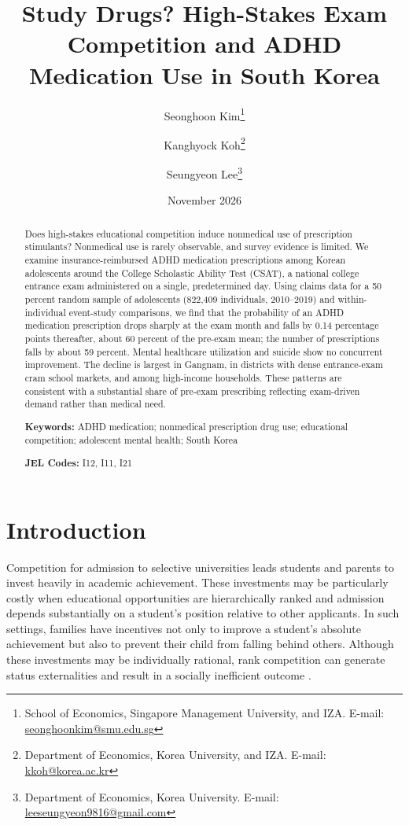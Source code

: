 \documentclass[12pt]{article}
\title{Study Drugs? High-Stakes Exam Competition and ADHD Medication Use in South Korea}
\author{
  Seonghoon Kim\thanks{School of Economics, Singapore Management University, and IZA. E-mail: \href{mailto:seonghoonkim@smu.edu.sg}{seonghoonkim@smu.edu.sg}}
  \and
  Kanghyock Koh\thanks{Department of Economics, Korea University, and IZA. E-mail: \href{mailto:kkoh@korea.ac.kr}{kkoh@korea.ac.kr}}
  \and
  Seungyeon Lee\thanks{Department of Economics, Korea University. E-mail: \href{mailto:leeseungyeon9816@gmail.com}{leeseungyeon9816@gmail.com}}
}
\date{November 2026}
\begin{document}
\maketitle

\begin{abstract}
\noindent Does high-stakes educational competition induce nonmedical use of prescription stimulants? Nonmedical use is rarely observable, and survey evidence is limited. We examine insurance-reimbursed ADHD medication prescriptions among Korean adolescents around the College Scholastic Ability Test (CSAT), a national college entrance exam administered on a single, predetermined day. Using claims data for a 50 percent random sample of adolescents (822,409 individuals, 2010--2019) and within-individual event-study comparisons, we find that the probability of an ADHD medication prescription drops sharply at the exam month and falls by 0.14 percentage points thereafter, about 60 percent of the pre-exam mean; the number of prescriptions falls by about 59 percent. Mental healthcare utilization and suicide show no concurrent improvement. The decline is largest in Gangnam, in districts with dense entrance-exam cram school markets, and among high-income households. These patterns are consistent with a substantial share of pre-exam prescribing reflecting exam-driven demand rather than medical need.

\medskip
\noindent\textbf{Keywords:} ADHD medication; nonmedical prescription drug use; educational competition; adolescent mental health; South Korea

\noindent\textbf{JEL Codes:} I12, I11, I21
\end{abstract}

\thispagestyle{empty}
\newpage
\setcounter{page}{1}

\section{Introduction}

Competition for admission to selective universities leads students and parents to invest heavily in academic achievement. These investments may be particularly costly when educational opportunities are hierarchically ranked and admission depends substantially on a student's position relative to other applicants. In such settings, families have incentives not only to improve a student's absolute achievement but also to prevent their child from falling behind others. Although these investments may be individually rational, rank competition can generate status externalities and result in a socially inefficient outcome \citep{kim2024}.
\end{document}
